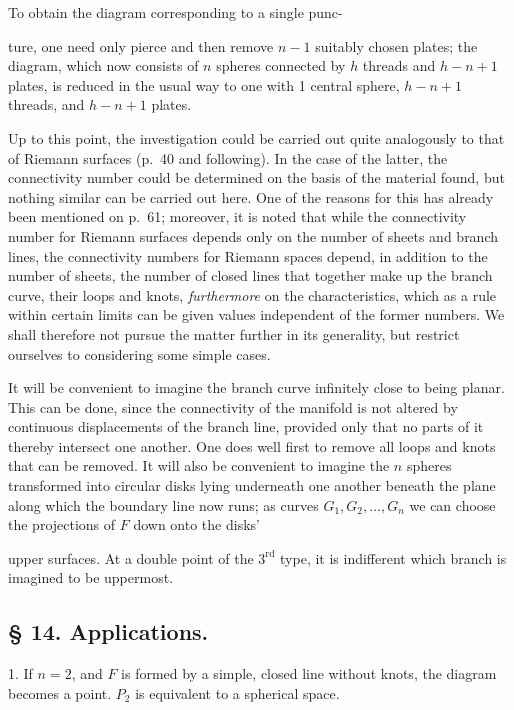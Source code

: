 \documentclass{article}
\begin{document}
To obtain the diagram corresponding to a single punc-

ture, one need only pierce and then remove $n - 1$ suitably chosen plates; the diagram, which now consists of $n$ spheres connected by $h$ threads and $h - n + 1$ plates, is reduced in the usual way to one with 1 central sphere, $h - n + 1$ threads, and $h - n + 1$ plates.

Up to this point, the investigation could be carried out quite analogously to that of Riemann surfaces (p.\ 40 and following). In the case of the latter, the connectivity number could be determined on the basis of the material found, but nothing similar can be carried out here. One of the reasons for this has already been mentioned on p.\ 61; moreover, it is noted that while the connectivity number for Riemann surfaces depends only on the number of sheets and branch lines, the connectivity numbers for Riemann spaces depend, in addition to the number of sheets, the number of closed lines that together make up the branch curve, their loops and knots, \emph{furthermore} on the characteristics, which as a rule within certain limits can be given values independent of the former numbers. We shall therefore not pursue the matter further in its generality, but restrict ourselves to considering some simple cases.

It will be convenient to imagine the branch curve infinitely close to being planar. This can be done, since the connectivity of the manifold is not altered by continuous displacements of the branch line, provided only that no parts of it thereby intersect one another. One does well first to remove all loops and knots that can be removed. It will also be convenient to imagine the $n$ spheres transformed into circular disks lying underneath one another beneath the plane along which the boundary line now runs; as curves $G_1, G_2, \dots, G_n$ we can choose the projections of $F$ down onto the disks'

upper surfaces. At a double point of the $3^{\text{rd}}$ type, it is indifferent which branch is imagined to be uppermost.

\subsection*{§ 14. Applications.}

1. If $n = 2$, and $F$ is formed by a simple, closed line without knots, the diagram becomes a point. $P_2$ is equivalent to a spherical space.
\end{document}
